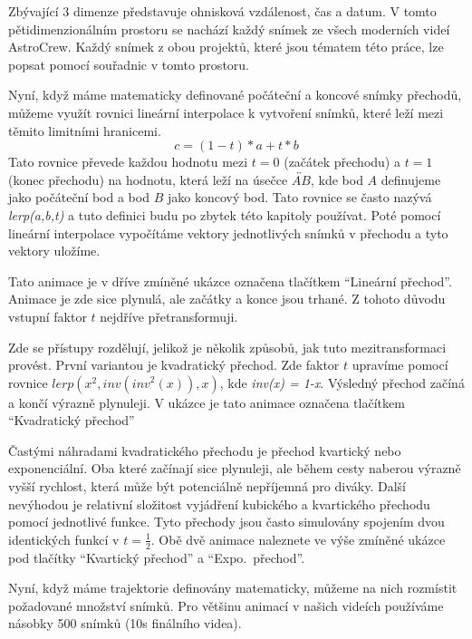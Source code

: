 \documentclass[12pt,a4paper,titlepage]{article}
\begin{document}
Zbývající 3 dimenze představuje ohnisková vzdálenost, čas a datum. V tomto pětidimenzionálním prostoru se nachází každý snímek ze všech moderních videí AstroCrew. Každý snímek z obou projektů, které jsou tématem této práce, lze popsat pomocí souřadnic v tomto prostoru.

Nyní, když máme matematicky definované počáteční a koncové snímky přechodů, můžeme využít rovnici lineární interpolace k vytvoření snímků, které leží mezi těmito limitními hranicemi.
\[c = (1-t)*a + t * b\] 
Tato rovnice převede každou hodnotu mezi $t=0$ (začátek přechodu) a $t=1$ (konec přechodu) na hodnotu, která leží na úsečce $\overleftrightarrow{AB}$, kde bod $A$ definujeme jako počáteční bod a bod $B$ jako koncový bod. Tato rovnice se často nazývá \textit{lerp(a,b,t)} a tuto definici budu po zbytek této kapitoly používat. Poté pomocí lineární interpolace vypočítáme vektory jednotlivých snímků v přechodu a tyto vektory uložíme.%

Tato animace je v dříve zmíněné ukázce označena tlačítkem \enquote{Lineární přechod}. Animace je zde sice plynulá, ale začátky a konce jsou trhané. Z tohoto důvodu vstupní faktor $t$ nejdříve přetransformuji. 

Zde se přístupy rozdělují, jelikož je několik způsobů, jak tuto mezitransformaci provést. První variantou je kvadratický přechod. Zde faktor $t$ upravíme pomocí rovnice $lerp({x}^{2}, inv({inv}^{2}(x)), x)$, kde \textit{inv(x) = 1-x}. Výsledný přechod začíná a končí výrazně plynuleji. V ukázce je tato animace označena tlačítkem \enquote{Kvadratický přechod} %

Častými náhradami kvadratického přechodu je přechod kvartický nebo exponenciální. Oba které začínají sice plynuleji, ale během cesty naberou výrazně vyšší rychlost, která může být potenciálně nepříjemná pro diváky. Další nevýhodou je relativní složitost vyjádření kubického a kvartického přechodu pomocí jednotlivé funkce. Tyto přechody jsou často simulovány spojením dvou identických funkcí v $t=\frac{1}{2}$. Obě dvě animace naleznete ve výše zmíněné ukázce pod tlačítky \enquote{Kvartický přechod} a \enquote{Expo.\ přechod}.

Nyní, když máme trajektorie definovány matematicky, můžeme na nich rozmístit požadované množství snímků. Pro většinu animací v našich videích používáme násobky 500 snímků (10s finálního videa).
\end{document}
